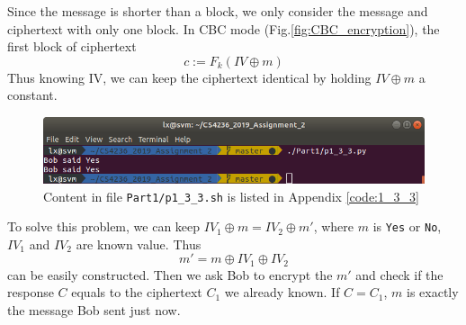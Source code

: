 Since the message is shorter than a block, we only consider the message and ciphertext with only one block.
In CBC mode (Fig.\ref{fig:CBC_encryption}), the first block of ciphertext 
$$c := F_k(IV \oplus m)$$
Thus knowing IV, we can keep the ciphertext identical by holding $IV \oplus m$ a constant.

\begin{figure}[t!]
\centering
\includegraphics[width=\columnwidth]{pictures/p1_3_3.png}
\caption{
    Content in file \texttt{Part1/p1\_3\_3.sh} is listed in Appendix \ref{code:1_3_3}
}
\label{fig:p1_3_3}
\end{figure}

To solve this problem, we can keep $IV_1 \oplus m = IV_2 \oplus m'$, where $m$ is \texttt{Yes} or \texttt{No}, $IV_1$ and $IV_2$ are known value. Thus
$$ m' = m \oplus IV_1 \oplus IV_2 $$
can be easily constructed. Then we ask Bob to encrypt the $m'$ and check if the response $C$ equals to the ciphertext $C_1$ we already known. If $C = C_1$, $m$ is exactly the message Bob sent just now.
